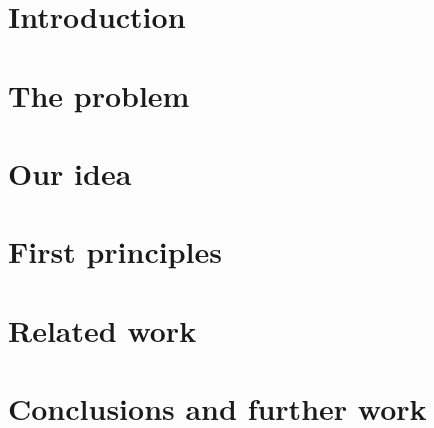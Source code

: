 \section{Introduction}  %

\section{The problem}  %

\section{Our idea}     %

\section{First principles}

\section{Related work} %
\label{ch:related}

\section{Conclusions and further work}

